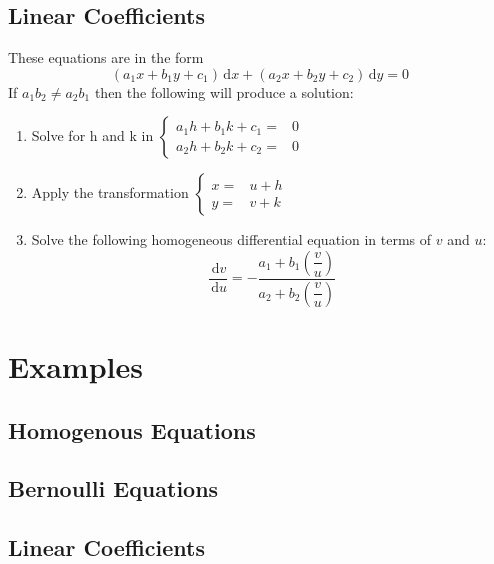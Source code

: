 \documentclass{article}
\newcommand{\ud}{\, \mathrm{d}}
\begin{document}
	\subsection{Linear Coefficients}
		These equations are in the form
		\begin{equation}
			(a_1x + b_1y + c_1)\ud x + (a_2x + b_2y + c_2)\ud y = 0
		\end{equation}
		If $a_1b_2 \not= a_2b_1$ then the following will produce a solution:
		\begin{enumerate}
			\item Solve for h and k in
				$\begin{cases}
					a_1h + b_1k + c_1 =&0 \\
					a_2h + b_2k + c_2 =&0
				\end{cases}$
			\item Apply the transformation
				$\begin{cases}
					x =&u + h \\
					y =&v + k
				\end{cases}$
			\item Solve the following homogeneous differential equation in terms of $v$ and $u$:
				\begin{equation}
					\frac{\ud v}{\ud u} = - \dfrac{a_1 + b_1(\dfrac{v}{u})}{a_2 + b_2(\dfrac{v}{u})}
				\end{equation}
		\end{enumerate}
\section{Examples}
	\subsection{Homogenous Equations}
	\subsection{Bernoulli Equations}
	\subsection{Linear Coefficients}
\end{document}
